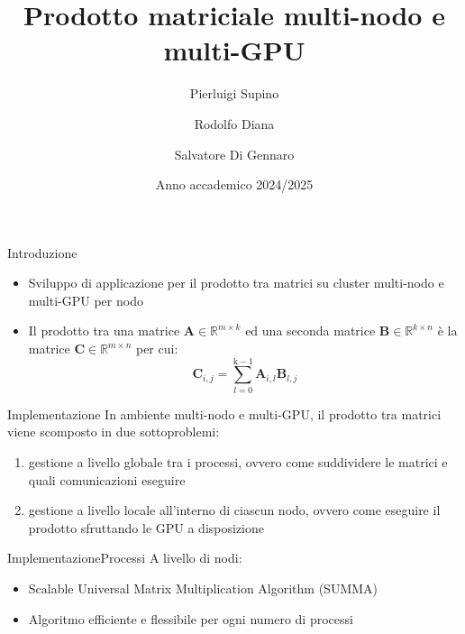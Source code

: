 \documentclass{beamer}
\title{Prodotto matriciale multi-nodo e multi-GPU}
\author{Pierluigi Supino \and Rodolfo Diana \and Salvatore Di Gennaro}
\date{Anno accademico 2024/2025}
\begin{document}
\begin{frame}
    \titlepage
\end{frame}

\begin{frame}{Introduzione}
    \begin{itemize}
        \item Sviluppo di applicazione per il prodotto tra matrici su cluster multi-nodo e multi-GPU per nodo
        \item Il prodotto tra una matrice $\mathbf{A} \in \mathbb{R}^{m\times{k}}$ ed una seconda matrice $\mathbf{B} \in \mathbb{R}^{k\times{n}}$ è la matrice $\mathbf{C} \in \mathbb{R}^{m\times{n}}$ per cui: $$ \mathbf{C}_{i,j} = \sum_{l=0}^{\text{k}-1} \mathbf{A}_{i, l} \mathbf{B}_{l, j} $$
    \end{itemize}
\end{frame}

\begin{frame}{Implementazione}
    In ambiente multi-nodo e multi-GPU, il prodotto tra matrici viene scomposto in due sottoproblemi:
    \begin{enumerate}
        \item gestione a livello globale tra i processi, ovvero come suddividere le matrici e quali comunicazioni eseguire
        \item gestione a livello locale all'interno di ciascun nodo, ovvero come eseguire il prodotto sfruttando le GPU a disposizione
    \end{enumerate}
\end{frame}

\begin{frame}{Implementazione}{Processi}
    A livello di nodi:
    \begin{itemize}
        \item Scalable Universal Matrix Multiplication Algorithm (SUMMA)
        \item Algoritmo efficiente e flessibile per ogni numero di processi
    \end{itemize}
\end{frame}
\end{document}
